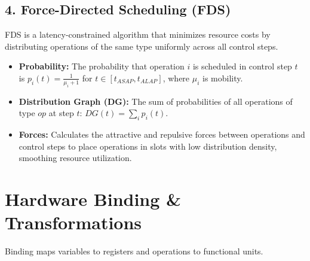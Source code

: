 \documentclass[12pt,a4paper]{article}
\begin{document}
\subsection{4. Force-Directed Scheduling (FDS)}
FDS is a latency-constrained algorithm that minimizes resource costs by distributing operations of the same type uniformly across all control steps.
\begin{itemize}[leftmargin=*, itemsep=2pt]
  \item \textbf{Probability:} The probability that operation $i$ is scheduled in control step $t$ is $p_i(t) = \frac{1}{\mu_i + 1}$ for $t \in [t_{ASAP}, t_{ALAP}]$, where $\mu_i$ is mobility.
  \item \textbf{Distribution Graph (DG):} The sum of probabilities of all operations of type $op$ at step $t$: $DG(t) = \sum_{i} p_i(t)$.
  \item \textbf{Forces:} Calculates the attractive and repulsive forces between operations and control steps to place operations in slots with low distribution density, smoothing resource utilization.
\end{itemize}

\section{Hardware Binding \& Transformations}

Binding maps variables to registers and operations to functional units.
\end{document}
